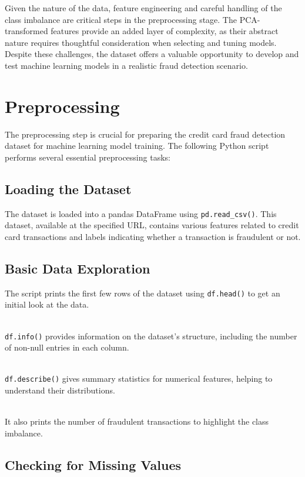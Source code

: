\documentclass{article}
\begin{document}
\noindent
Given the nature of the data, feature engineering and careful handling of the class imbalance are critical steps in the preprocessing stage. The PCA-transformed features provide an added layer of complexity, as their abstract nature requires thoughtful consideration when selecting and tuning models. Despite these challenges, the dataset offers a valuable opportunity to develop and test machine learning models in a realistic fraud detection scenario.

\section{Preprocessing}

The preprocessing step is crucial for preparing the credit card fraud detection dataset for machine learning model training. The following Python script performs several essential preprocessing tasks:

\subsection{Loading the Dataset}

The dataset is loaded into a pandas DataFrame using \verb|pd.read_csv()|. This dataset, available at the specified URL, contains various features related to credit card transactions and labels indicating whether a transaction is fraudulent or not.


\subsection{Basic Data Exploration}

The script prints the first few rows of the dataset using \verb|df.head()| to get an initial look at the data.

\ \\
\verb|df.info()| provides information on the dataset’s structure, including the number of non-null entries in each column.

\ \\
\verb|df.describe()| gives summary statistics for numerical features, helping to understand their distributions. 

\ \\
It also prints the number of fraudulent transactions to highlight the class imbalance.

\subsection{Checking for Missing Values}
\end{document}

